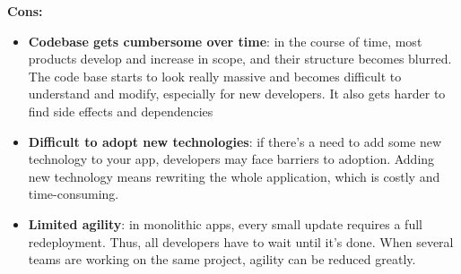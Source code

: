 \documentclass[10pt,a4paper]{article}
\begin{document}
\textbf{Cons:}
\begin{itemize}
	\item \textbf{Codebase gets cumbersome over time}: in the course of time, most products develop and increase in scope, and their structure becomes blurred. The code base starts to look really massive and becomes difficult to understand and modify, especially for new developers. It also gets harder to find side effects and dependencies
	\item \textbf{Difficult to adopt new technologies}: if there’s a need to add some new technology to your app, developers may face barriers to adoption. Adding new technology means rewriting the whole application, which is costly and time-consuming.
	\item \textbf{Limited agility}: in monolithic apps, every small update requires a full redeployment. Thus, all developers have to wait until it’s done. When several teams are working on the same project, agility can be reduced greatly.
\end{itemize}
\end{document}
